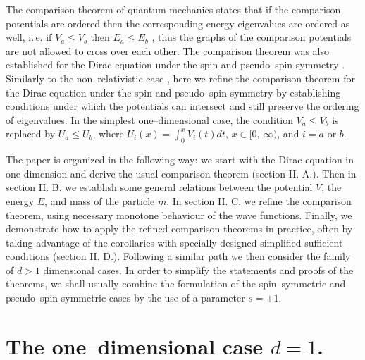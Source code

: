 \documentclass[amsmath,amssymb,superscriptaddress,showkeys, showpacs, aps, nofootinbib]{revtex4}
\begin{document}
The comparison theorem of quantum mechanics states that if the comparison potentials are ordered then the corresponding energy eigenvalues are ordered as well, i.\,e. if $V_a\le V_b$ then $E_a\le E_b$ \cite{CT1, CT2, CT3, CT4, CT5, CT6, CT7}, thus the graphs of the comparison potentials are not allowed to cross over each other. The comparison theorem was also established for the Dirac equation under the spin and pseudo--spin symmetry \cite{HY}. Similarly to the non--relativistic case \cite{Hall7}, here we refine the comparison theorem for the Dirac equation under the spin and pseudo--spin symmetry by establishing conditions under which the potentials can intersect and still preserve the ordering of eigenvalues. In the simplest one--dimensional case, the condition $V_a\le V_b$ is replaced by $U_a\le U_b$, where $U_i(x)=\int_0^x V_i(t)dt$, $x\in[0,\ \infty)$, and $i=a$ or $b$.

The paper is organized in the following way: we start with the Dirac equation in one dimension and derive the usual comparison theorem (section II. A.). Then in section II. B. we establish some general relations between the  potential $V$,  the energy $E$, and mass of the particle $m$. In section II. C. we refine the comparison theorem, using necessary monotone behaviour of the wave functions. Finally, we demonstrate how to apply the refined comparison theorems in practice, often by taking advantage of the corollaries with specially designed simplified sufficient conditions (section II. D.). Following a similar path we then consider the family of $d>1$ dimensional cases. In order to simplify the statements and proofs of the theorems, we shall usually combine the formulation of the spin--symmetric and pseudo--spin-symmetric cases by the use of a parameter $s=\pm 1.$

\section{The one--dimensional case $d=1$.}
\end{document}
